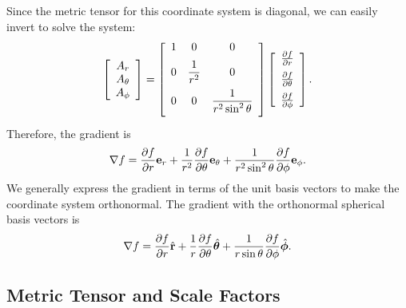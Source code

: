 Since the metric tensor for this coordinate system is diagonal, we can easily invert to solve the system:
\begin{align}
  \left[ \begin{array}{c} A_r \\ A_\theta \\ A_\phi \\ \end{array} \right] = 
  \left[ \begin{array}{c c c} 
  1 & 0   & 0 \vspace{0.2cm}  \\
  0 & \dfrac{1}{r^2} & 0 \vspace{0.2cm} \\
  0 & 0   & \dfrac{1}{r^2 \sin^2 \theta} \vspace{0.2cm} \\ \end{array} \right]
  \left[ \begin{array}{c} \dho{f}{r} \vspace{0.2cm} \\  \dho{f}{\theta} \vspace{0.2cm} \\ \dho{f}{\phi} \\ \end{array} \right] .
\end{align}
Therefore, the gradient is
\begin{align}
  \nabla f = \frac{ \partial {f} }{ \partial {r} } \mathbf{e}_r + \frac{1}{r^2} \frac{ \partial {f} }{ \partial {\theta} } \mathbf{e}_\theta + \frac{1}{r^2 \sin^2 \theta} \frac{ \partial {f} }{ \partial {\phi} } \mathbf{e}_\phi .
\end{align}
We generally express the gradient in terms of the unit basis vectors to make the coordinate system orthonormal. The gradient with the orthonormal spherical basis vectors is
\begin{align}
  \nabla f = \frac{ \partial {f} }{ \partial {r} } \hat{\mathbf{r}} + \frac{1}{r} \frac{ \partial {f} }{ \partial {\theta} } \hat{\boldsymbol\theta} + \frac{1}{r \sin \theta} \frac{ \partial {f} }{ \partial {\phi} } \hat{\boldsymbol\phi} .
\end{align}


\subsection{Metric Tensor and Scale Factors}

